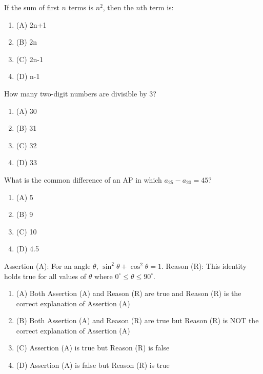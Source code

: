 \documentclass[12pt,a4paper]{exam}
\begin{document}
\begin{questions}
\question[1] If the sum of first $n$ terms is $n^2$, then the $n$th term is:
\begin{enumerate}[label=(\Alph*)]
  \item (A) 2n+1
  \item (B) 2n
  \item (C) 2n-1
  \item (D) n-1
\end{enumerate}
\vspace{0.15cm}

\question[1] How many two-digit numbers are divisible by 3?
\begin{enumerate}[label=(\Alph*)]
  \item (A) 30
  \item (B) 31
  \item (C) 32
  \item (D) 33
\end{enumerate}
\vspace{0.15cm}

\question[1] What is the common difference of an AP in which $a_{25} - a_{20} = 45$?
\begin{enumerate}[label=(\Alph*)]
  \item (A) 5
  \item (B) 9
  \item (C) 10
  \item (D) 4.5
\end{enumerate}
\vspace{0.15cm}

\question[1] Assertion (A): For an angle $\theta$, $\sin^2 \theta + \cos^2 \theta = 1$. Reason (R): This identity holds true for all values of $\theta$ where $0^\circ \le \theta \le 90^\circ$.
\begin{enumerate}[label=(\Alph*)]
  \item (A) Both Assertion (A) and Reason (R) are true and Reason (R) is the correct explanation of Assertion (A)
  \item (B) Both Assertion (A) and Reason (R) are true but Reason (R) is NOT the correct explanation of Assertion (A)
  \item (C) Assertion (A) is true but Reason (R) is false
  \item (D) Assertion (A) is false but Reason (R) is true
\end{enumerate}
\vspace{0.15cm}


\end{questions}
\end{document}
